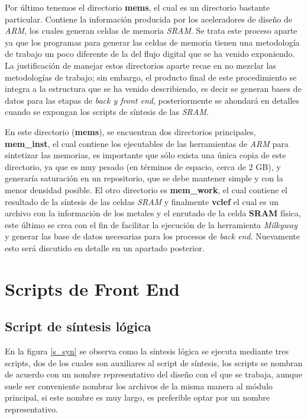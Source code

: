 Por último tenemos el directorio \textbf{mems}, el cual es un directorio bastante particular. Contiene la información producida por los aceleradores de diseño de \textit{ARM}, los cuales generan celdas de memoria \textit{SRAM}. Se trata este proceso aparte ya que los programas para generar las celdas de memoria tienen una metodología de trabajo un poco diferente de la del flujo digital que se ha venido exponiendo. La justificación de manejar estos directorios aparte recae en no mezclar las metodologías de trabajo; sin embargo, el producto final de este procedimiento se integra a la estructura que se ha venido describiendo, es decir se generan bases de datos para las etapas de \textit {back y front end}, posteriormente se ahondará en detalles cuando se expongan los scripts de síntesis de las \textit{SRAM}.

En este directorio (\textbf{mems}), se encuentran dos directorios principales, \textbf{mem\_inst}, el cual contiene los ejecutables de las herramientas de \textit{ARM} para sintetizar las memorias, es importante que sólo exista una única copia de este directorio, ya que es muy pesado (en términos de espacio, cerca de 2 GB), y generaría saturación en un repositorio, que se debe mantener simple y con la menor densidad posible. El otro directorio es \textbf{mem\_work}, el cual contiene el resultado de la síntesis de las celdas \textit{SRAM} y finalmente \textbf{vclef} el cual es un archivo con la información de los metales y el enrutado de la celda \textbf{SRAM} física, este último se crea con el fin de facilitar la ejecución de la herramienta \textit{Milkyway} y generar las base de datos necesarias para los procesos de \textit{back end}. Nuevamente esto será discutido en detalle en un apartado posterior.



\section{Scripts de Front End}
\label{sec:syn_s}
\subsection{Script de síntesis lógica}
\label{script_syn}
En la figura \ref{s_syn} se observa como la síntesis lógica se ejecuta mediante tres scripts, dos de los cuales son auxiliares al script de síntesis, los scripts se nombran de acuerdo con un nombre representativo del diseño con el que se trabaja, aunque suele ser conveniente nombrar los archivos de la misma manera al módulo principal, si este nombre es muy largo, es preferible optar por un nombre representativo.

